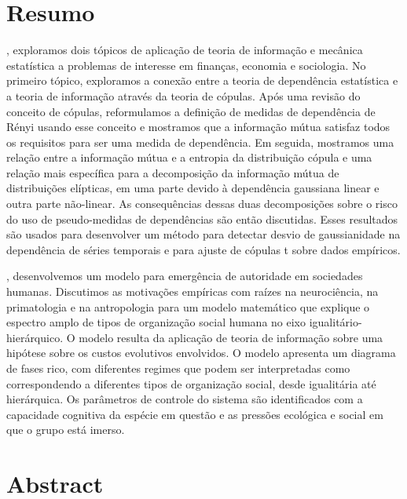 \chapter*{Resumo}
, exploramos dois tópicos de aplicação de teoria de informação e mecânica estatística a problemas de interesse em finanças, economia e sociologia. No primeiro tópico, exploramos a conexão entre a teoria de dependência estatística e a teoria de informação através da teoria de cópulas. Após uma revisão do conceito de cópulas, reformulamos a definição de medidas de dependência de Rényi\cite{Renyi1959} usando esse conceito e mostramos que a informação mútua satisfaz todos os requisitos para ser uma medida de dependência. Em seguida, mostramos uma relação entre a informação mútua e a entropia da distribuição cópula e uma relação mais específica para a decomposição da informação mútua de distribuições elípticas, em uma parte devido à dependência gaussiana linear e outra parte não-linear. As consequências dessas duas decomposições sobre o risco do uso de pseudo-medidas de dependências são então discutidas. Esses resultados são usados para desenvolver um método para detectar desvio de gaussianidade na dependência de séries temporais e para ajuste de cópulas t sobre dados empíricos\cite{Calsaverini2009}.

, desenvolvemos um modelo para emergência de autoridade em sociedades humanas. Discutimos as motivações empíricas com raízes na neurociência, na primatologia e na antropologia para um modelo matemático que explique o espectro amplo de tipos de organização social humana no eixo igualitário-hierárquico. O modelo resulta da aplicação de teoria de informação sobre uma hipótese sobre os custos evolutivos envolvidos. O modelo apresenta um diagrama de fases rico, com diferentes regimes que podem ser interpretadas como correspondendo a diferentes tipos de organização social, desde igualitária até hierárquica. Os parâmetros de controle do sistema são identificados com a capacidade cognitiva da espécie em questão e as pressões ecológica e social em que o grupo está imerso.

\chapter*{Abstract}
 
